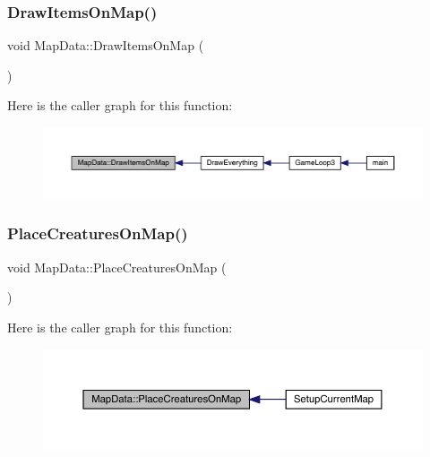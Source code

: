 \subsubsection{\texorpdfstring{Draw\+Items\+On\+Map()}{DrawItemsOnMap()}}
{\footnotesize\ttfamily void Map\+Data\+::\+Draw\+Items\+On\+Map (\begin{DoxyParamCaption}{ }\end{DoxyParamCaption})}

Here is the caller graph for this function\+:
\nopagebreak
\begin{figure}[H]
\begin{center}
\leavevmode
\includegraphics[width=350pt]{de/d83/class_map_data_abfdefc2bef87a02d3d83176ad6ba7832_icgraph}
\end{center}
\end{figure}
\mbox{\label{class_map_data_ad377a46f779bfcb9ac57dcdd3a969eca}} 
\subsubsection{\texorpdfstring{Place\+Creatures\+On\+Map()}{PlaceCreaturesOnMap()}}
{\footnotesize\ttfamily void Map\+Data\+::\+Place\+Creatures\+On\+Map (\begin{DoxyParamCaption}{ }\end{DoxyParamCaption})}

Here is the caller graph for this function\+:
\nopagebreak
\begin{figure}[H]
\begin{center}
\leavevmode
\includegraphics[width=350pt]{de/d83/class_map_data_ad377a46f779bfcb9ac57dcdd3a969eca_icgraph}
\end{center}
\end{figure}
\mbox{\label{class_map_data_aae575fa856f1d179220c4781873fd635}} 
